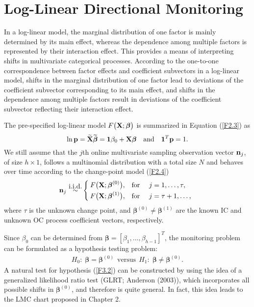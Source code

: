 \section{Log-Linear Directional Monitoring}\label{sec3.3}

In a log-linear model, the marginal distribution of one factor is mainly determined
by its main effect, whereas the dependence among multiple factors is represented by
their interaction effect. This provides a means of interpreting shifts in
multivariate categorical processes. According to the one-to-one correspondence
between factor effects and coefficient subvectors in a log-linear model, shifts in
the marginal distribution of one factor lead to deviations of the coefficient
subvector corresponding to its main effect, and shifts in the dependence among
multiple factors result in deviations of the coefficient subvector reflecting their
interaction effect.

The pre-specified log-linear model $F\big({\bf X}; \boldsymbol\beta\big)$ is summarized in
Equation (\ref{F2.3}) as
\[
\ln{\bf p}=\widetilde{{\bf X}}\widetilde{\boldsymbol{\beta}}=\boldsymbol 1\beta_0+{\bf
X}\boldsymbol\beta\quad \mathrm{and}\quad\boldsymbol1^T{\bf p}=1.
\]
We still assume that the $j$th online multivariate sampling observation vector ${\bf
n}_j$, of size $h\times 1$, follows a multinomial distribution with a total size $N$
and behaves over time according to the change-point model (\ref{F2.4})
\begin{align*}
{\bf n}_j\ {\mathop{\sim}\limits^{\mbox{i.i.d.}}}\left\{\hspace{-0.1cm}
\begin{array}{ll} F\big({\bf X};\bm{\beta}^{(0)}\big), &
{\mathrm{for\ }} \quad j=1,\ldots,\tau,\\[0.1cm]
F\big({\bf X};\bm\beta^{(1)}\big), & {\mathrm {for\ }} \quad j=\tau+1,\ldots,
\end{array}\right.
\end{align*}
where $\tau$ is the unknown change point, and $\bm\beta^{(0)} \neq \bm\beta^{(1)}$
are the known IC and unknown OC process coefficient vectors, respectively.

Since $\beta_0$ can be determined from $\bm{\beta}=[\beta_1,\ldots, \beta_{h-1}]^T$,
the monitoring problem can be formulated as a hypothesis testing problem:
\begin{align}\label{F3.2}
H_0:\;\bm{\beta}=\bm{\beta}^{(0)}\ \ \mbox{versus}\ \
H_1:\;\bm{\beta}\ne\bm{\beta}^{(0)}.
\end{align}
A natural test for hypothesis (\ref{F3.2}) can be constructed by using the idea of a
generalized likelihood ratio test (GLRT; Anderson (2003)), which incorporates all
possible shifts in $\bm{\beta}^{(0)}$, and therefore is quite general. In fact, this
idea leads to the LMC chart proposed in Chapter 2.

